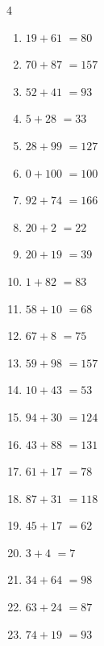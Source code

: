 \begin{multicols}{4}
\begin{enumerate}
  \item $19+61$
        $=80$

  \item $70+87$
        $=157$

  \item $52+41$
        $=93$

  \item $5+28$
        $=33$

  \item $28+99$
        $=127$

  \item $0+100$
        $=100$

  \item $92+74$
        $=166$

  \item $20+2$
        $=22$

  \item $20+19$
        $=39$

  \item $1+82$
        $=83$

  \item $58+10$
        $=68$

  \item $67+8$
        $=75$

  \item $59+98$
        $=157$

  \item $10+43$
        $=53$

  \item $94+30$
        $=124$

  \item $43+88$
        $=131$

\columnbreak %

\resetques

  \item $61+17$
        $=78$

  \item $87+31$
        $=118$

  \item $45+17$
        $=62$

  \item $3+4$
        $=7$

  \item $34+64$
        $=98$

  \item $63+24$
        $=87$

  \item $74+19$
        $=93$


\end{enumerate}
\end{multicols}
